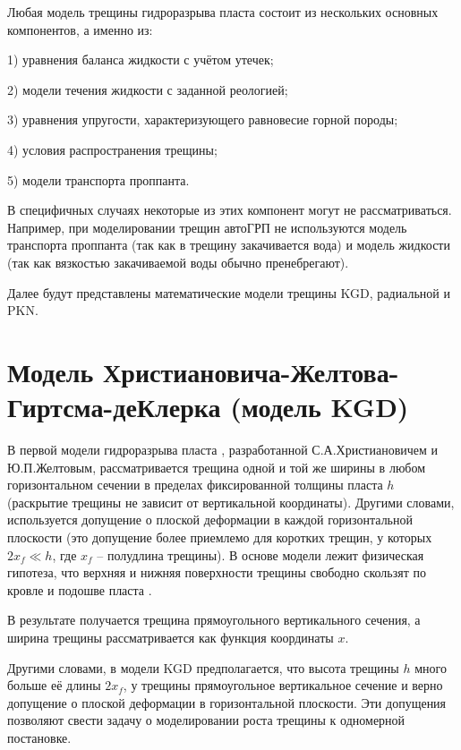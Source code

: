 Любая модель трещины гидроразрыва пласта состоит из нескольких основных компонентов, а именно из:

1) уравнения баланса жидкости с учётом утечек;

2) модели течения жидкости с заданной реологией;

3) уравнения упругости, характеризующего равновесие горной породы;

4) условия распространения трещины;

5) модели транспорта проппанта.

В специфичных случаях некоторые из этих компонент могут не рассматриваться.
Например, при моделировании трещин автоГРП не используются модель транспорта проппанта (так как в трещину закачивается вода) и модель жидкости (так как вязкостью закачиваемой воды обычно пренебрегают).

Далее будут представлены математические модели трещины KGD, радиальной и PKN.

\section{Модель Христиановича-Желтова-Гиртсма-деКлерка (модель KGD)}
\vspace*{-5mm}

В первой модели гидроразрыва пласта \cite{khristianovic_zheltov}, разработанной С.А.Христиановичем и Ю.П.Желтовым, рассматривается трещина одной и той же ширины в любом горизонтальном сечении в пределах фиксированной толщины пласта $h$ (раскрытие трещины не зависит от вертикальной координаты).
Другими словами, используется допущение о плоской деформации в каждой горизонтальной плоскости (это допущение более приемлемо для коротких трещин, у которых $2x_{\!f}\ll h$, где $x_{\!f}$ -- полудлина трещины).
В основе модели лежит физическая гипотеза, что верхняя и нижняя поверхности трещины свободно скользят по кровле и подошве пласта \cite{economides}.

В результате получается трещина прямоугольного вертикального сечения, а ширина трещины рассматривается как функция координаты $x$.

Другими словами, в модели KGD предполагается, что высота трещины $h$ много больше её длины $2x_{\!f}$, у трещины прямоугольное вертикальное сечение и верно допущение о плоской деформации в горизонтальной плоскости.
Эти допущения позволяют свести задачу о моделировании роста трещины к одномерной постановке.



